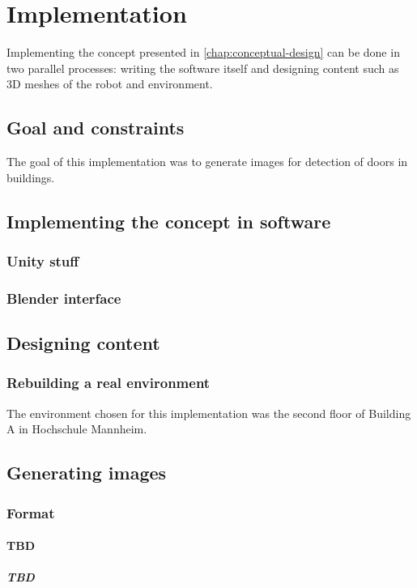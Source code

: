 \chapter{Implementation}
Implementing the concept presented in \autoref{chap:conceptual-design} can be done in two parallel processes: writing the software itself and designing content such as 3D meshes of the robot and environment.

\section{Goal and constraints}
The goal of this implementation was to generate images for detection of doors in buildings. 

\section{Implementing the concept in software}
\subsection{Unity stuff}
\subsection{Blender interface}

\section{Designing content}
\subsection{Rebuilding a real environment}
The environment chosen for this implementation was the second floor of Building A in Hochschule Mannheim. 


\section{Generating images}

\subsection{Format}
\subsubsection{TBD}
 
\paragraph{TBD}

\section{}